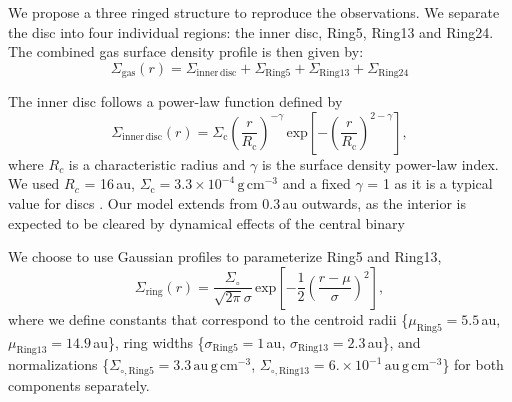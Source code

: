 \documentclass[usenatbib,times]{mnras}
\begin{document}
We propose a three ringed structure to reproduce the observations. We separate the disc into four individual regions: the inner disc, Ring5, Ring13 and Ring24. The combined gas surface density profile is then given by:
\begin{equation}
  \Sigma_{\mathrm{gas}}(r) = \Sigma_{\mathrm{inner\,disc}} + \Sigma_{\mathrm{Ring5}} + \Sigma_{\mathrm{Ring13}} + \Sigma_{\mathrm{Ring24}}
\end{equation}

The inner disc follows a power-law function defined by
\begin{equation}
  \Sigma_{\mathrm{inner\,disc}}(r) =\Sigma_\mathrm{c} \left(\frac{r}{R_\mathrm{c}}\right)^{-\gamma}  \, \mathrm{exp}\left[-\left(\frac{r}{R_\mathrm{c}}\right)^{2-\gamma}\right],
\end{equation}
where $R_c$ is a characteristic radius and $\gamma$ is the surface density power-law index. We used $R_c$ = 16\,au, $\Sigma_\mathrm{c} =3.3\times10^{-4}$\,$\mathrm{g\,cm^{-3}}$ and a fixed $\gamma$ = 1 as it is a typical value for discs \citep{Andrews_2009,Andrews_2010}. Our model extends from 0.3\,au outwards, as the interior is expected to be cleared by dynamical effects of the central binary \citep{Art_Lu}

We choose to use Gaussian profiles to parameterize Ring5 and Ring13,
\begin{equation}
  \Sigma_{\mathrm{ring}}(r) = \frac{\Sigma_\circ}{\sqrt{2 \pi} \sigma}
  \, \mathrm{exp}\left[-\frac{1}{2}\left(\frac{r-\mu}{\sigma}\right)^{2}\right],
\end{equation}
where we define constants that correspond to the centroid radii \{$\mu_{\mathrm{Ring5}}=5.5$\,au, $\mu_{\mathrm{Ring13}}=14.9$\,au\}, ring widths \{$\sigma_{\mathrm{Ring5}}=1$\,au, $\sigma_{\mathrm{Ring13}}=2.3$\,au\}, and normalizations \{$\Sigma_{\circ,\mathrm{Ring5}}=3.3$\,$\mathrm{au\,g\,cm^{-3}}$, $\Sigma_{\circ,\mathrm{Ring13}}=6. \times 10^{-1}$\,$\mathrm{au\,g\,cm^{-3}}$\} for both components separately.
\end{document}
